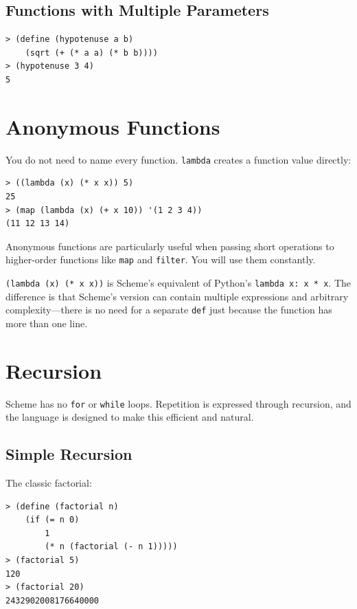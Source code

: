 \subsection{Functions with Multiple Parameters}

\begin{lstlisting}[style=repl]
> (define (hypotenuse a b)
    (sqrt (+ (* a a) (* b b))))
> (hypotenuse 3 4)
5
\end{lstlisting}

\section{Anonymous Functions}

You do not need to name every function. \texttt{lambda} creates a function value directly:

\begin{lstlisting}[style=repl]
> ((lambda (x) (* x x)) 5)
25
> (map (lambda (x) (+ x 10)) '(1 2 3 4))
(11 12 13 14)
\end{lstlisting}

Anonymous functions are particularly useful when passing short operations to higher-order functions like \texttt{map} and \texttt{filter}. You will use them constantly.

\begin{note}
\texttt{(lambda (x) (* x x))} is Scheme's equivalent of Python's \texttt{lambda x: x * x}. The difference is that Scheme's version can contain multiple expressions and arbitrary complexity---there is no need for a separate \texttt{def} just because the function has more than one line.
\end{note}

\section{Recursion}

Scheme has no \texttt{for} or \texttt{while} loops. Repetition is expressed through recursion, and the language is designed to make this efficient and natural.

\subsection{Simple Recursion}

The classic factorial:

\begin{lstlisting}[style=repl]
> (define (factorial n)
    (if (= n 0)
        1
        (* n (factorial (- n 1)))))
> (factorial 5)
120
> (factorial 20)
2432902008176640000
\end{lstlisting}

